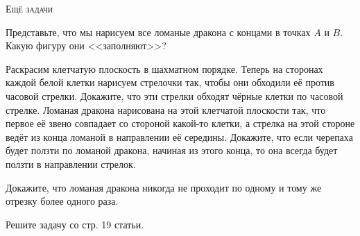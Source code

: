 


\newpage

\centerline{\textsc{\Large Ещё задачи}}



\setcounter{z}{9}
\z \setcounter{lett}{2}
 Представьте, что мы нарисуем все ломаные дракона с концами в точках $A$ и $B$. Какую фигуру они <<заполняют>>?


\setcounter{z}{11}


\z Раскрасим клетчатую плоскость в шахматном порядке. Теперь на сторонах каждой белой клетки нарисуем стрелочки так, чтобы они обходили её против часовой стрелки.
 Докажите, что эти стрелки обходят чёрные клетки по часовой стрелке.
 Ломаная дракона нарисована на этой клетчатой плоскости так, что первое её звено совпадает со стороной какой-то клетки, а стрелка на этой стороне ведёт из конца ломаной в направлении её середины. Докажите, что если черепаха будет ползти по ломаной дракона, начиная из этого конца, то она всегда будет ползти в направлении стрелок.

\z Докажите, что ломаная дракона никогда не проходит по одному и тому же отрезку более одного раза.


\z Решите задачу со стр. 19 статьи.


\vfill

